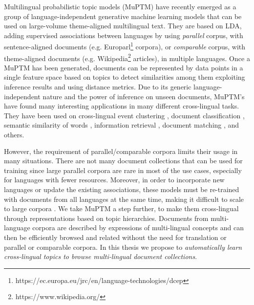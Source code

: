 Multilingual probabilistic topic models (MuPTM) \cite{Vulic2015} have recently emerged as a group of language-independent generative machine learning models that can be used on large-volume theme-aligned multilingual text. They are based on LDA, adding supervised associations between languages by using \textit{parallel} corpus, with sentence-aligned documents (e.g. Europarl\footnote{https://ec.europa.eu/jrc/en/language-technologies/dcep} corpora), or \textit{comparable} corpus, with theme-aligned documents (e.g. Wikipedia\footnote{https://www.wikipedia.org/} articles), in multiple languages. Once a MuPTM has been generated, documents can be represented by data points in a single feature space based on topics to detect similarities among them exploiting inference results and using distance metrics. Due to its generic language-independent nature and the power of inference on unseen documents, MuPTM's have found many interesting applications in many different cross-lingual tasks. They have been used on cross-lingual event clustering \cite{DeSmet2009}, document classification \cite{10.1007/978-3-642-20841-6_45} \cite{Ni:2011:CLT:1935826.1935887},  semantic similarity of words \cite{Mimno:2009:PTM:1699571.1699627}  \cite{Vulic:2012:DHC:2380816.2380872}, information retrieval \cite{10.1007/978-3-642-36973-5_9} \cite{ganguly-etal-2012-cross}, document matching \cite{Platt:2010:TDR:1870658.1870683} \cite{zhu-etal-2013-building}, and others. 

However, the requirement of parallel/comparable corpora limits their usage in many situations. There are not many document collections that can be used for training since large parallel corpora are rare in most of the use cases, especially for languages with fewer resources. Moreover, in order to incorporate new languages or update the existing associations, these models must be re-trained with documents from all languages at the same time, making it difficult to scale to large corpora \cite{Hao2018} \cite{Moritz2017}. We take MuPTM a step further, to make them cross-lingual through representations based on topic hierarchies. Documents from multi-language corpora are described by expressions of multi-lingual concepts and can then be efficiently browsed and related without the need for translation or parallel or comparable corpora. In this thesis we propose to \textit{automatically learn cross-lingual topics to browse multi-lingual document collections}. 

